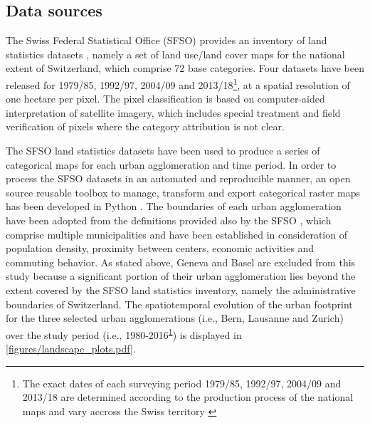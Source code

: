 \documentclass[10pt,letterpaper]{article}
\begin{document}
\subsection*{Data sources}

The Swiss Federal Statistical Office (SFSO) provides an inventory of land statistics datasets \cite{sfso2017statistique}, namely a set of land use/land cover maps for the national extent of Switzerland, which comprise 72 base categories. Four datasets have been released for 1979/85, 1992/97, 2004/09 and 2013/18\footnote{\label{fn:years}The exact dates of each surveying period 1979/85, 1992/97, 2004/09 and 2013/18 are determined according to the production process of the national maps and vary accross the Swiss territory \cite{sfso2017statistique}}, at a spatial resolution of one hectare per pixel.
The pixel classification is based on computer-aided interpretation of satellite imagery, which includes special treatment and field verification of pixels where the category attribution is not clear.

The SFSO land statistics datasets have been used to produce a series of categorical maps for each urban agglomeration and time period.
In order to process the SFSO datasets in an automated and reproducible manner, an open source reusable toolbox to manage, transform and export categorical raster maps has been developed in Python \cite{bosch2019swisslandstats}.
The boundaries of each urban agglomeration have been adopted from the definitions provided also by the SFSO \cite{sfso2014espace}, which comprise multiple municipalities and have been established in consideration of population density, proximity between centers, economic activities and commuting behavior.
As stated above, Geneva and Basel are excluded from this study because a significant portion of their urban agglomeration lies beyond the extent covered by the SFSO land statistics inventory, namely the administrative boundaries of Switzerland.
The spatiotemporal evolution of the urban footprint for the three selected urban agglomerations (i.e., Bern, Lausanne and Zurich) over the study period (i.e., 1980-2016\textsuperscript{\ref{fn:years}}) is displayed in \autoref{figures/landscape_plots.pdf}.
\end{document}
